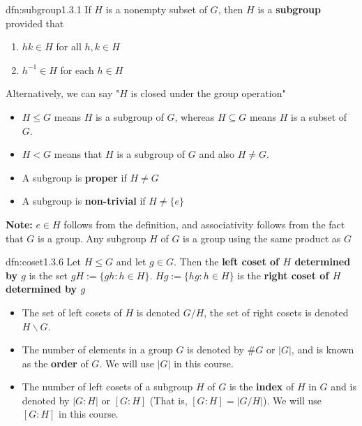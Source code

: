 \documentclass{article}
\begin{document}
\begin{dfn}[Subgroups]{dfn:subgroup}{1.3.1}
    If $H$ is a nonempty subset of $G$, then $H$ is a \textbf{subgroup} provided that
    \begin{enumerate}
        \item $hk \in H$ for all $h, k\in H$
        \item $h^{-1}\in H$ for each $h\in H$
    \end{enumerate}

    Alternatively, we can say "$H$ is closed under the group operation"

    \vspace{-5pt}
    \begin{itemize}
        \item $H \le G$ means $H$ is a subgroup of $G$, whereas $H \subseteq G$ means $H$ is a subset of $G$.
        \item $H < G$ means that $H$ is a subgroup of $G$ and also $H \ne G$.
        \item A subgroup is \textbf{proper} if $H \ne G$
        \item A subgroup is \textbf{non-trivial} if $H \ne \{e\}$
    \end{itemize}
\end{dfn}



\textbf{Note:} $e\in H$ follows from the definition, and associativity follows from the fact that $G$ is a group. Any subgroup $H$ of $G$ is a group using the same product as $G$

\newpage
\begin{dfn}[Cosets]{dfn:coset}{1.3.6}
    Let $H \le G$ and let $g\in G$. Then the \textbf{left coset of $H$ determined by $g$} is the set $gH := \{gh : h\in H\}$. $Hg := \{hg : h\in H\}$ is the \textbf{right coset of $H$ determined by $g$}

    \begin{itemize}
        \item The set of left cosets of $H$ is denoted $G / H$, the set of right cosets is denoted $H \backslash G$.
        \item The number of elements in a group $G$ is denoted by $\# G$ or $\lvert G \rvert$, and is known as the \textbf{order} of $G$. We will use $\lvert G \rvert$ in this course.
        \item The number of left cosets of a subgroup $H$ of $G$ is the \textbf{index} of $H$ in $G$ and is denoted by $\lvert  G : H \rvert$ or $[ G : H]$ (That is, $[G : H] = \lvert G / H \rvert$). We will use $[G : H]$ in this course.
    \end{itemize}
\end{dfn}
\end{document}
